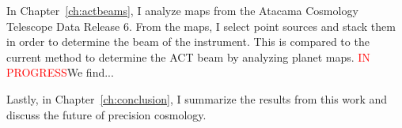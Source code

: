 In Chapter~\ref{ch:actbeams}, I analyze maps from the Atacama Cosmology Telescope Data Release 6.  From the maps, I select point sources and stack them in order to determine the beam of the instrument.  This is compared to the current method to determine the ACT beam by analyzing planet maps.  \textcolor{red}{IN PROGRESS}We find...

Lastly, in Chapter~\ref{ch:conclusion}, I summarize the results from this work and discuss the future of precision cosmology.